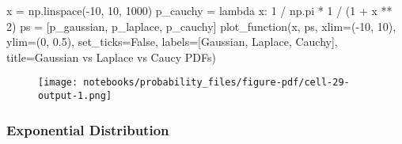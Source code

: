\documentclass[
  letterpaper,
  DIV=11,
  numbers=noendperiod]{scrreprt}
\newenvironment{Shaded}{\begin{snugshade}}{\end{snugshade}}
\newcommand{\DecValTok}[1]{\textcolor[rgb]{0.68,0.00,0.00}{#1}}
\newcommand{\FloatTok}[1]{\textcolor[rgb]{0.68,0.00,0.00}{#1}}
\newcommand{\KeywordTok}[1]{\textcolor[rgb]{0.00,0.23,0.31}{#1}}
\newcommand{\NormalTok}[1]{\textcolor[rgb]{0.00,0.23,0.31}{#1}}
\newcommand{\OperatorTok}[1]{\textcolor[rgb]{0.37,0.37,0.37}{#1}}
\newcommand{\StringTok}[1]{\textcolor[rgb]{0.13,0.47,0.30}{#1}}
\newcommand{\VariableTok}[1]{\textcolor[rgb]{0.07,0.07,0.07}{#1}}
\begin{document}
\begin{Shaded}
\begin{Highlighting}[]
\NormalTok{x }\OperatorTok{=}\NormalTok{ np.linspace(}\OperatorTok{{-}}\DecValTok{10}\NormalTok{, }\DecValTok{10}\NormalTok{, }\DecValTok{1000}\NormalTok{)}
\NormalTok{p\_cauchy }\OperatorTok{=} \KeywordTok{lambda}\NormalTok{ x: }\DecValTok{1} \OperatorTok{/}\NormalTok{ np.pi }\OperatorTok{*} \DecValTok{1} \OperatorTok{/}\NormalTok{ (}\DecValTok{1} \OperatorTok{+}\NormalTok{ x }\OperatorTok{**} \DecValTok{2}\NormalTok{)}
\NormalTok{ps }\OperatorTok{=}\NormalTok{ [p\_gaussian, p\_laplace, p\_cauchy]}
\NormalTok{plot\_function(x, ps, xlim}\OperatorTok{=}\NormalTok{(}\OperatorTok{{-}}\DecValTok{10}\NormalTok{, }\DecValTok{10}\NormalTok{), ylim}\OperatorTok{=}\NormalTok{(}\DecValTok{0}\NormalTok{, }\FloatTok{0.5}\NormalTok{), set\_ticks}\OperatorTok{=}\VariableTok{False}\NormalTok{, labels}\OperatorTok{=}\NormalTok{[}\StringTok{\textquotesingle{}Gaussian\textquotesingle{}}\NormalTok{, }\StringTok{\textquotesingle{}Laplace\textquotesingle{}}\NormalTok{, }\StringTok{\textquotesingle{}Cauchy\textquotesingle{}}\NormalTok{],}
\NormalTok{             title}\OperatorTok{=}\StringTok{\textquotesingle{}Gaussian vs Laplace vs Caucy PDFs\textquotesingle{}}\NormalTok{)}
\end{Highlighting}
\end{Shaded}

\begin{figure}[H]

{\centering \texttt{[image: notebooks/probability\_files/figure-pdf/cell-29-output-1.png]}

}

\end{figure}

\hypertarget{exponential-distribution}{%
\subsubsection{Exponential
Distribution}\label{exponential-distribution}}
\end{document}
